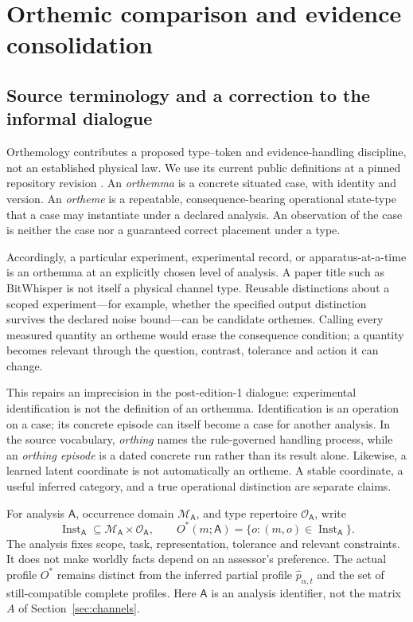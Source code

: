\section{Orthemic comparison and evidence consolidation}\label{sec:orthemic}
\subsection{Source terminology and a correction to the informal dialogue}
Orthemology contributes a proposed type--token and evidence-handling discipline, not an established physical law. We use its current public definitions at a pinned repository revision \citep{orthemology}. An \emph{orthemma} is a concrete situated case, with identity and version. An \emph{ortheme} is a repeatable, consequence-bearing operational state-type that a case may instantiate under a declared analysis. An observation of the case is neither the case nor a guaranteed correct placement under a type.

Accordingly, a particular experiment, experimental record, or apparatus-at-a-time is an orthemma at an explicitly chosen level of analysis. A paper title such as BitWhisper is not itself a physical channel type. Reusable distinctions about a scoped experiment---for example, whether the specified output distinction survives the declared noise bound---can be candidate orthemes. Calling every measured quantity an ortheme would erase the consequence condition; a quantity becomes relevant through the question, contrast, tolerance and action it can change.

This repairs an imprecision in the post-edition-1 dialogue: experimental identification is not the definition of an orthemma. Identification is an operation on a case; its concrete episode can itself become a case for another analysis. In the source vocabulary, \emph{orthing} names the rule-governed handling process, while an \emph{orthing episode} is a dated concrete run rather than its result alone. Likewise, a learned latent coordinate is not automatically an ortheme. A stable coordinate, a useful inferred category, and a true operational distinction are separate claims.

For analysis $\mathsf A$, occurrence domain $\mathcal M_{\mathsf A}$, and type repertoire $\mathcal O_{\mathsf A}$, write
\begin{equation}\label{eq:orthemicprofile}
 \operatorname{Inst}_{\mathsf A}\subseteq
 \mathcal M_{\mathsf A}\times\mathcal O_{\mathsf A},\qquad
 O^*(m;\mathsf A)=\{o:(m,o)\in\operatorname{Inst}_{\mathsf A}\}.
\end{equation}
The analysis fixes scope, task, representation, tolerance and relevant constraints. It does not make worldly facts depend on an assessor's preference. The actual profile $O^*$ remains distinct from the inferred partial profile $\hat p_{\alpha,t}$ and the set of still-compatible complete profiles. Here $\mathsf A$ is an analysis identifier, not the matrix $A$ of Section~\ref{sec:channels}.


